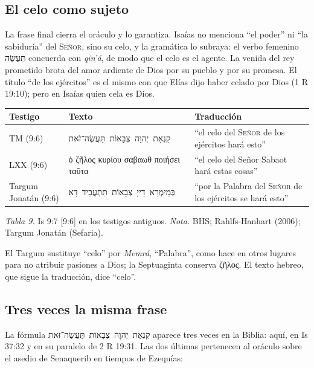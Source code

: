 \documentclass[11pt,letterpaper]{article}
\newcommand{\heb}[1]{\mbox{\foreignlanguage{hebrew}{#1}}}
\newcommand{\grc}[1]{\foreignlanguage{ancientgreek}{#1}}
\newcommand{\SENOR}{\textsc{Señor}}
\begin{document}
\subsection{El celo como sujeto}
La frase final cierra el oráculo y lo garantiza. Isaías no menciona ``el poder'' ni ``la sabiduría'' del \SENOR, sino su celo, y la gramática lo subraya: el verbo femenino \heb{תַּעֲשֶׂה} concuerda con \emph{qin'á}, de modo que el celo es el agente. La venida del rey prometido brota del amor ardiente de Dios por su pueblo y por su promesa. El título ``de los ejércitos'' es el mismo con que Elías dijo haber celado por Dios (1 R 19:10); pero en Isaías quien cela es Dios.

\begin{center}\small\renewcommand{\arraystretch}{1.2}
\begin{tabular}{@{}L{2.8cm}L{5.4cm}L{5.4cm}@{}}
\toprule
\textbf{Testigo} & \textbf{Texto} & \textbf{Traducción} \\ \midrule
TM (9:6) & \heb{קִנְאַת יְהוָה צְבָאוֹת תַּעֲשֶׂה־זֹּאת} & ``el celo del \SENOR{} de los ejércitos hará esto'' \\
LXX (9:6) & \grc{ὁ ζῆλος κυρίου σαβαωθ ποιήσει ταῦτα} & ``el celo del Señor Sabaot hará estas cosas'' \\
Targum Jonatán (9:6) & \heb{בְּמֵימְרָא דַייָ צְבָאוֹת תִּתְעֲבֵיד דָא} & ``por la Palabra del \SENOR{} de los ejércitos se hará esto'' \\
\bottomrule
\end{tabular}\par
{\footnotesize\color{gris}\textit{Tabla 9.} Is 9:7 [9:6] en los testigos antiguos. \textit{Nota.} BHS; Rahlfs-Hanhart (2006); Targum Jonatán (Sefaria).}
\end{center}

\begin{nota}
El Targum sustituye ``celo'' por \emph{Memrá}, ``Palabra'', como hace en otros lugares para no atribuir pasiones a Dios; la Septuaginta conserva \grc{ζῆλος}. El texto hebreo, que sigue la traducción, dice ``celo''.
\end{nota}

\subsection{Tres veces la misma frase}
La fórmula \heb{קִנְאַת יְהוָה צְבָאוֹת תַּעֲשֶׂה־זֹּאת} aparece tres veces en la Biblia: aquí, en Is 37:32 y en su paralelo de 2 R 19:31. Las dos últimas pertenecen al oráculo sobre el asedio de Senaquerib en tiempos de Ezequías:
\end{document}
